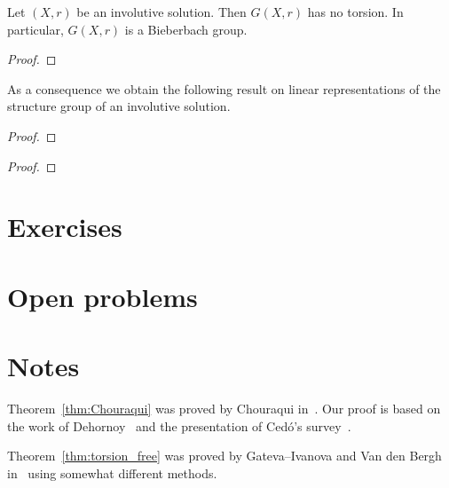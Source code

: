 \begin{theorem}
\label{thm:torsion_free}
Let $(X,r)$ be an involutive solution. Then $G(X,r)$ has no torsion. In particular, $G(X,r)$ is a Bieberbach group.
\end{theorem}

\begin{proof}

\end{proof}

As a consequence we obtain the following result on linear 
representations of the structure group of an involutive solution.

\begin{theorem}
\label{thm:ESS}
\end{theorem}

\begin{proof}

\end{proof}

\begin{theorem}
\label{thm:D}
\end{theorem}

\begin{proof}

\end{proof}

\section*{Exercises}

\section*{Open problems}

\section*{Notes}

Theorem~\ref{thm:Chouraqui} was proved by Chouraqui in~\cite{MR2764830}. Our proof is based on the work 
of Dehornoy~\cite{MR3374524} and the presentation of Cedó's survey~\cite{MR3824447}. 

Theorem~\ref{thm:torsion_free} was proved by Gateva--Ivanova and Van den Bergh in~\cite{MR1637256} using somewhat 
different methods. 